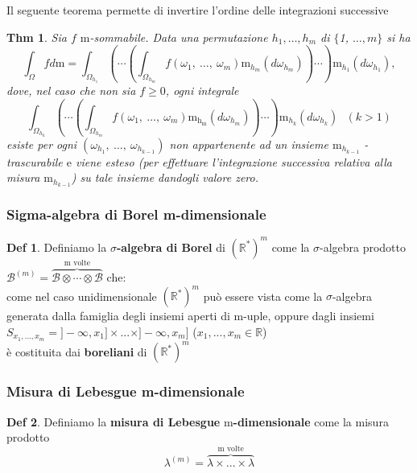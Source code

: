 \documentclass[a4paper,11pt]{article}
\theoremstyle{plain}
\newtheorem{thm}{Thm}[section]
\theoremstyle{definition}
\newtheorem{defn}{Def}[section]
\theoremstyle{remark}
\begin{document}
\noindent
Il seguente teorema permette di invertire l'ordine delle integrazioni successive
\begin{thm}
Sia $f$ $\mathrm{m}$-sommabile. Data una permutazione $h_{1}, \ldots, h_{m}$ di $\{$1, $\ldots, m\}$ si ha
$$
\displaystyle \int_{\Omega}fd\mathrm{m}=\int_{\Omega_{h_{1}}}\left(\cdots\left(\int_{\Omega_{h_{m}}}f(\omega_{1},\ \ldots,\ \omega_{m})\mathrm{m}_{h_{m}}(d\omega_{h_{m}})\right)\cdots\right)\mathrm{m}_{h_{1}}(d\omega_{h_{1}}),
$$ 
dove, nel caso che non sia $f\geq 0$, ogni integrale
$$
\displaystyle \int_{\Omega_{h_{k}}}\left(\cdots\left(\int_{\Omega_{h_{m}}}f(\omega_{1},\ \ldots,\ \omega_{m})\mathrm{m}_{\mathrm{h}_{\mathrm{m}}}(d\omega_{h_{m}})\right)\cdots \right)\mathrm{m}_{h_{k}}(d\omega_{h_{k}}) \,\,\,\, (k>1)
$$
esiste per ogni $(\omega_{h_{1}},\ \ldots,\ \omega_{h_{k-1}})$ non appartenente ad un insieme $\mathrm{m}_{h_{k-1}}$ -trascurabile $\mathrm{e}$ viene esteso (per effettuare l'integrazione successiva relativa alla misura $\mathrm{m}_{h_{k-1}}$) su tale insieme dandogli valore zero.
\end{thm}

\subsubsection{Sigma-algebra di Borel m-dimensionale}
\begin{defn} Definiamo la \textbf{$\sigma$-algebra di Borel} di $(\mathbb{R}^{*})^{m}$ come la $\sigma$-algebra prodotto $\mathcal{B}^{(m)}=\overbrace{\mathcal{B} \otimes  \cdots \otimes \mathcal{B}}^{\textrm{m volte}}$ che: \\
\noindent
[ - ] come nel caso unidimensionale $(\mathbb{R}^{*})^{m}$ può essere vista come la $\sigma$-algebra generata dalla famiglia degli insiemi aperti di m-uple, oppure dagli insiemi $S_{x_1,...,x_m} = ]-\infty,x_1]\times ... \times ]-\infty,x_m]$ ($x_1,...,x_m \in \mathbb{R}$)\\
\noindent
[ - ] è costituita dai \textbf{boreliani} di $(\mathbb{R}^{*})^{m}$
\end{defn}

\subsubsection{Misura di Lebesgue m-dimensionale}
\begin{defn} Definiamo la \textbf{misura di Lebesgue} m\textbf{-dimensionale} come la misura prodotto 
$$
\lambda^{(m)}=\overbrace{\lambda \times ... \times \lambda}^{\textrm{m volte}}
$$
\end{defn}
\end{document}
